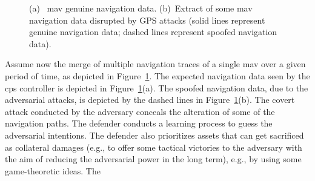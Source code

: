 \documentclass[letterpaper, 10pt, conference]{IEEEtran}
\begin{document}
\begin{figure}[!t]
\centering
{}
\caption{(a)~ \gls*{mav} genuine navigation data. (b)~Extract of some
  \gls*{mav} navigation data disrupted by GPS attacks (solid lines
  represent genuine navigation data; dashed lines represent spoofed
  navigation data).\label{fig:fig2}}
\end{figure}
Assume now the merge of multiple navigation traces of a single
\gls*{mav} over a given period of time, as depicted in
Figure~\ref{fig:fig2}. The expected navigation data seen by the
\gls*{cps} controller is depicted in Figure~\ref{fig:fig2}(a). The
spoofed navigation data, due to the adversarial attacks, is depicted
by the dashed lines in Figure~\ref{fig:fig2}(b). The covert attack
conducted by the adversary conceals the alteration of some of the
navigation paths. The defender conducts a learning process to guess
the adversarial intentions. The defender also prioritizes assets that
can get sacrificed as collateral damages (e.g., to offer some tactical
victories to the adversary with the aim of reducing the adversarial
power in the long term), e.g., by using some game-theoretic ideas. The
\end{document}
